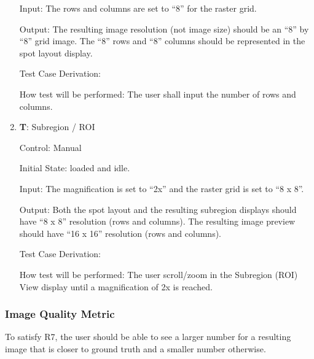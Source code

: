 \documentclass[12pt, titlepage]{article}
\newcounter{testnum} %
\begin{document}
\begin{enumerate}
    Input: The rows and columns are set to ``8'' for the raster grid.
              
    Output: The resulting image resolution (not image size) should be an ``8'' by ``8'' grid image.
    The ``8'' rows and ``8'' columns should be represented in the spot layout display.

    Test Case Derivation: 

    How test will be performed: The user shall input the number of rows and columns.

    \item{\textbf{T\thetestnum \label{T_subregion}}: Subregion / ROI\\}

    Control: Manual
                
    Initial State: \progname{} loaded and idle.
              
    Input: The magnification is set to ``2x'' and the raster grid is set to ``8 x 8''.
              
    Output: Both the spot layout and the resulting subregion displays should have ``8 x 8'' resolution (rows and columns). 
    The resulting image preview should have ``16 x 16'' resolution (rows and columns).

    Test Case Derivation: 

    How test will be performed: The user scroll/zoom in the Subregion (ROI) View display until a magnification of 2x is reached.

\end{enumerate}


\subsubsection{Image Quality Metric} \label{subsec_img_metric}

To satisfy R7, the user should be able to see a larger number for a resulting image that is closer to ground truth 
and a smaller number otherwise.
\end{document}

